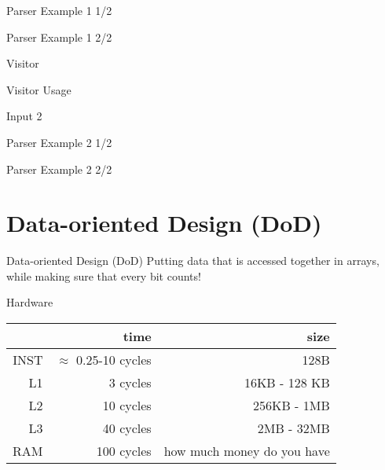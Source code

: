 \documentclass[aspectratio=169,notes]{beamer}
\begin{document}
	\begin{frame}[fragile]{Parser Example 1 1/2}
		
	\end{frame}

	\begin{frame}[fragile]{Parser Example 1 2/2}
		
	\end{frame}

	\begin{frame}[fragile]{Visitor}
		
	\end{frame}

	\begin{frame}[fragile]{Visitor Usage}
		
	\end{frame}

	\begin{frame}[fragile]{Input 2}
		
	\end{frame}

	\begin{frame}[fragile]{Parser Example 2 1/2}
		
	\end{frame}

	\begin{frame}[fragile]{Parser Example 2 2/2}
		
	\end{frame}

	\section{Data-oriented Design (DoD)}

	\begin{frame}[fragile]{Data-oriented Design (DoD)}
		\large
		\centering Putting data that is accessed together in arrays, while
			making sure that every bit counts!
	\end{frame}

	\begin{frame}[fragile]{Hardware}
		\centering
		\begin{tabular}{r r r}
				& time & size \\ \hline
		   INST & $\approx{}$ 0.25-10 cycles & 128B \\
\pause
			L1 & 3 cycles & 16KB - 128 KB \\
			L2 & 10 cycles & 256KB - 1MB \\
			L3 & 40 cycles & 2MB - 32MB \\
		   RAM & 100 cycles & how much money do you have
		\end{tabular}

	\end{frame}
\end{document}
